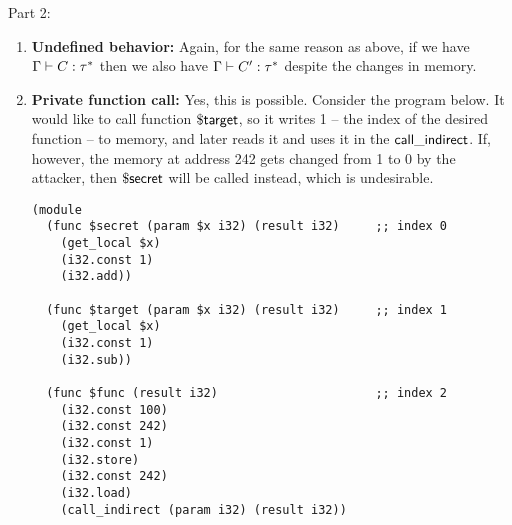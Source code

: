 \documentclass[11pt]{article}
\begin{document}
Part 2:

\begin{enumerate}
\item \textbf{Undefined behavior:} Again, for the same reason as above, if we have $\Gamma \vdash C : \tau^*$ then we also have $\Gamma \vdash C' : \tau^*$ despite the changes in memory.
\item \textbf{Private function call:} Yes, this is possible. Consider the program below. It would like to call function $\mathsf{\$target}$, so it writes 1 – the index of the desired function – to memory, and later reads it and uses it in the $\mathsf{call\_indirect}$. If, however, the memory at address 242 gets changed from 1 to 0 by the attacker, then $\mathsf{\$secret}$ will be called instead, which is undesirable.

\begin{lstlisting}[frame=single]
(module
  (func $secret (param $x i32) (result i32)     ;; index 0 
    (get_local $x)
    (i32.const 1)
    (i32.add))

  (func $target (param $x i32) (result i32)     ;; index 1
    (get_local $x)
    (i32.const 1)
    (i32.sub))

  (func $func (result i32)                      ;; index 2
    (i32.const 100)
    (i32.const 242)
    (i32.const 1)
    (i32.store)
    (i32.const 242)
    (i32.load)
    (call_indirect (param i32) (result i32))
\end{lstlisting}
\end{enumerate}
\end{document}
